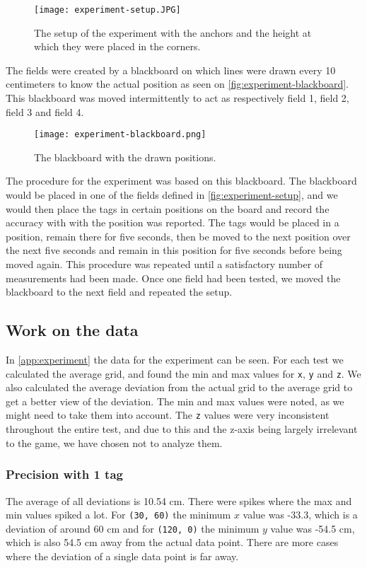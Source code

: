 \begin{figure}[H]
    \centering
    \texttt{[image: experiment-setup.JPG]}
    \caption{The setup of the experiment with the anchors and the height at which they were placed in the corners.}
    \label{fig:experiment-setup}
\end{figure}
\noindent
The fields were created by a blackboard on which lines were drawn every 10 centimeters to know the actual position as seen on \autoref{fig:experiment-blackboard}.
This blackboard was moved intermittently to act as respectively field 1, field 2, field 3 and field 4.

\begin{figure}[H]
    \centering
    \texttt{[image: experiment-blackboard.png]}
    \caption{The blackboard with the drawn positions.}
    \label{fig:experiment-blackboard}
\end{figure}
\noindent
The procedure for the experiment was based on this blackboard.
The blackboard would be placed in one of the fields defined in \autoref{fig:experiment-setup}, and we would then place the tags in certain positions on the board and record the accuracy with with the position was reported.
The tags would be placed in a position, remain there for five seconds, then be moved to the next position over the next five seconds and remain in this position for five seconds before being moved again.
This procedure was repeated until a satisfactory number of measurements had been made.
Once one field had been tested, we moved the blackboard to the next field and repeated the setup.
 
\subsection{Work on the data}
In \autoref{app:experiment} the data for the experiment can be seen.
For each test we calculated the average grid, and found the min and max values for \texttt{x}, \texttt{y} and \texttt{z}.
We also calculated the average deviation from the actual grid to the average grid to get a better view of the deviation.
The min and max values were noted, as we might need to take them into account. 
The \texttt{z} values were very inconsistent throughout the entire test, and due to this and the z-axis being largely irrelevant to the game, we have chosen not to analyze them.

\subsubsection{Precision with 1 tag} 
The average of all deviations is 10.54 cm.
There were spikes where the max and min values spiked a lot.
For \texttt{(30, 60)} the minimum $x$ value was -33.3, which is a deviation of around 60 cm and for \texttt{(120, 0)} the minimum $y$ value was -54.5 cm, which is also 54.5 cm away from the actual data point.
There are more cases where the deviation of a single data point is far away. 

